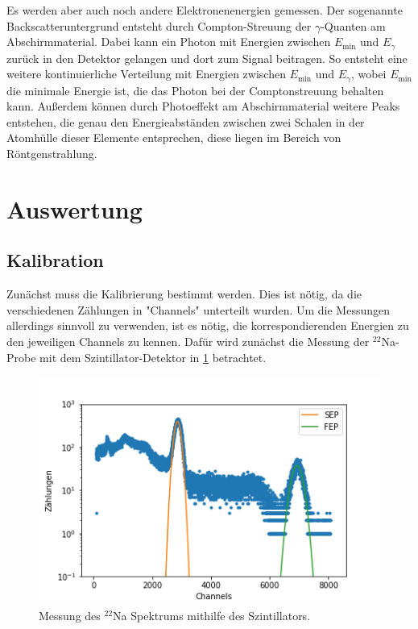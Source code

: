 Es werden aber auch noch andere Elektronenenergien gemessen. Der sogenannte Backscatteruntergrund entsteht durch Compton-Streuung der $\gamma$-Quanten am Abschirmmaterial. Dabei kann ein Photon mit Energien zwischen $E_\text{min}$ und $E_\gamma$ zurück in den Detektor gelangen und dort zum Signal beitragen. So entsteht eine weitere kontinuierliche Verteilung mit Energien zwischen $E_\text{min}$ und $E_\gamma$, wobei $E_\text{min}$ die minimale Energie ist, die das Photon bei der Comptonstreuung behalten kann. Außerdem können durch Photoeffekt am Abschirmmaterial weitere Peaks entstehen, die genau den Energieabständen zwischen zwei Schalen in der Atomhülle dieser Elemente entsprechen, diese liegen im Bereich von Röntgenstrahlung.


\section{Auswertung}
\subsection{Kalibration}
Zunächst muss die Kalibrierung bestimmt werden. Dies ist nötig, da die verschiedenen Zählungen in "Channels" unterteilt wurden. Um die Messungen allerdings sinnvoll zu verwenden, ist es nötig, die korrespondierenden Energien zu den jeweiligen Channels zu kennen. Dafür wird zunächst die Messung der $^{22}$Na-Probe mit dem Szintillator-Detektor in \cref{Kali} betrachtet.

\begin{figure}[ht]
	\centering
	\includegraphics[scale=0.8]{na.png}
	\caption{Messung des $^{22}$Na Spektrums mithilfe des Szintillators.}
	\label{Kali}
\end{figure}

